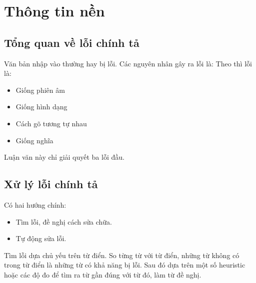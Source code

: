 \documentclass[a4paper]{book} %
\begin{document}














\chapter{Thông tin nền}
\label{cha:background}

\section{Tổng quan về lỗi chính tả}

Văn bản nhập vào thường hay bị lỗi. Các nguyên nhân gây ra lỗi là:
Theo \cite{Chang} thì lỗi là:
\begin{itemize}
\item Giống phiên âm
\item Giống hình dạng
\item Cách gõ tương tự nhau
\item Giống nghĩa
\end{itemize}

Luận văn này chỉ giải quyết ba lỗi đầu.

\section{Xử lý lỗi chính tả}

Có hai hướng chính:
\begin{itemize}
\item Tìm lỗi, đề nghị cách sửa chữa.
\item Tự động sửa lỗi.
\end{itemize}

Tìm lỗi dựa chủ yếu trên từ điển. So từng từ với từ điển, những từ
không có trong từ điển là những từ có khả năng bị lỗi. Sau đó dựa trên
một số heuristic hoặc các độ đo để tìm ra từ gần đúng với từ đó, làm
từ đề nghị.
\end{document}
